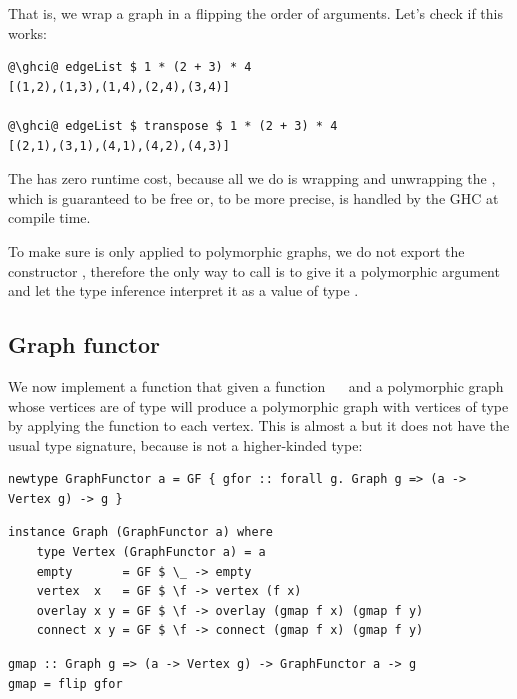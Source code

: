\noindent
That is, we wrap a graph in a  flipping the order of  arguments.
Let's check if this works:

\begin{verbatim}
@\ghci@ edgeList $ 1 * (2 + 3) * 4
[(1,2),(1,3),(1,4),(2,4),(3,4)]

@\ghci@ edgeList $ transpose $ 1 * (2 + 3) * 4
[(2,1),(3,1),(4,1),(4,2),(4,3)]
\end{verbatim}

The  has zero runtime cost, because all we do is wrapping and unwrapping
the , which is guaranteed to be free or, to be more precise, is handled
by the GHC at compile time.

To make sure  is only applied to polymorphic graphs, we do not export
the constructor , therefore the only way to call  is to give it a
polymorphic argument and let the type inference interpret it as a value of type
.

\subsection{Graph functor}\label{sub-functor}

We now implement a function  that given a function ~\hs{->}~
and a polymorphic graph whose vertices are of type  will produce a
polymorphic graph with vertices of type  by applying the function
to each vertex. This is almost a  but it does not have the usual
type signature, because  is not a higher-kinded type:

\vspace{2mm}
\begin{verbatim}
newtype GraphFunctor a = GF { gfor :: forall g. Graph g => (a -> Vertex g) -> g }
\end{verbatim}
\vspace{1mm}
\begin{verbatim}
instance Graph (GraphFunctor a) where
    type Vertex (GraphFunctor a) = a
    empty       = GF $ \_ -> empty
    vertex  x   = GF $ \f -> vertex (f x)
    overlay x y = GF $ \f -> overlay (gmap f x) (gmap f y)
    connect x y = GF $ \f -> connect (gmap f x) (gmap f y)
\end{verbatim}
\vspace{1mm}
\begin{verbatim}
gmap :: Graph g => (a -> Vertex g) -> GraphFunctor a -> g
gmap = flip gfor
\end{verbatim}

